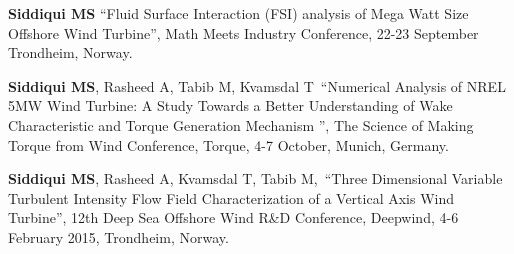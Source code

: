 

\begin{cventries}
	
	\cventry
	{} %
	{} %
	{} %
	{} %
	{
		\begin{cvitems} %
		\item {\textbf{Siddiqui MS} “Fluid Surface Interaction (FSI) analysis of Mega Watt Size Offshore Wind Turbine”, Math Meets Industry Conference, 22-23 September Trondheim, Norway.}	
		\item {\textbf{Siddiqui MS}, Rasheed A, Tabib M, Kvamsdal T “Numerical Analysis of NREL 5MW Wind Turbine: A Study Towards a Better Understanding of Wake Characteristic and Torque Generation Mechanism ”, The Science of Making Torque from Wind Conference, Torque, 4-7 October, Munich, Germany.}			
		\item {\textbf{Siddiqui MS}, Rasheed A,  Kvamsdal T, Tabib M, “Three Dimensional Variable Turbulent Intensity Flow Field Characterization of a Vertical Axis Wind Turbine”, 12th Deep Sea Offshore Wind R\&D Conference, Deepwind, 4-6 February 2015, Trondheim, Norway.}				
		\end{cvitems}
	}
\end{cventries}
